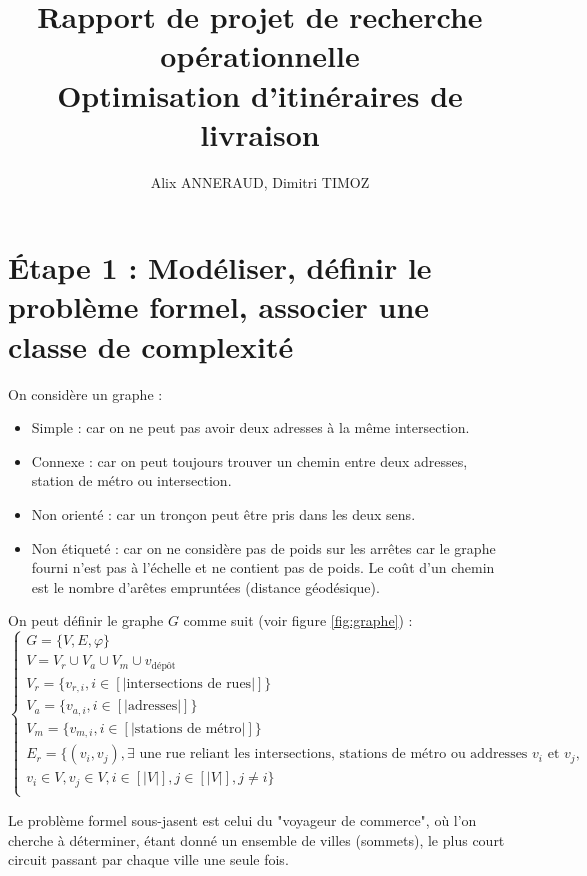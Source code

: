 \documentclass{article}
\title{Rapport de projet de recherche opérationnelle\\
    Optimisation d'itinéraires de livraison}
\begin{document}
\author{Alix ANNERAUD, Dimitri TIMOZ}

\maketitle

\section{Étape 1 : Modéliser, définir le problème formel, associer une classe de complexité}

On considère un graphe :

\begin{itemize}
    \item Simple : car on ne peut pas avoir deux adresses à la même intersection.
    \item Connexe : car on peut toujours trouver un chemin entre deux adresses, station de métro ou intersection.
    \item Non orienté : car un tronçon peut être pris dans les deux sens.
    \item Non étiqueté : car on ne considère pas de poids sur les arrêtes car le graphe fourni n'est pas à l'échelle et ne contient pas de poids. Le coût d'un chemin est le nombre d'arêtes empruntées (distance géodésique).
\end{itemize}

On peut définir le graphe $G$ comme suit (voir figure \ref{fig:graphe}) :
$$
\begin{cases}
    G = \{ V, E, \varphi \} \\
    V = V_r \cup V_a \cup V_m \cup v_\text{dépôt} \\
    V_r = \{ v_{r, i}, i \in [|\text{intersections de rues}|] \} \\
    V_a = \{ v_{a, i}, i \in [|\text{adresses}|] \} \\
    V_m = \{ v_{m, i}, i \in [|\text{stations de métro}|] \} \\
    E_r =  \{ (v_{i}, v_{j}), \exists \text{ une rue reliant les intersections, stations de métro ou addresses } v_{i} \text{ et } v_{j},\\ v_{i} \in V, v_{j} \in V, i \in [|V|], j \in [|V|], j \neq i \} \\
\end{cases}
$$

Le problème formel sous-jasent est celui du "voyageur de commerce", où l'on cherche à déterminer, étant donné un ensemble de villes (sommets), le plus court circuit passant par chaque ville une seule fois.
\end{document}
